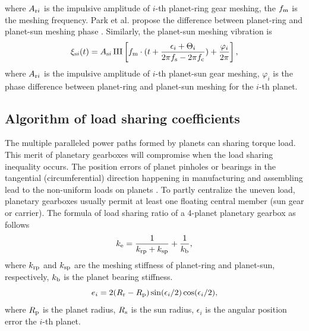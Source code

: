 \documentclass[a4paper,fleqn]{cas-sc}%
\begin{document}
where $A_{{\rm r}i}$ is the impulsive amplitude of $i$-th planet-ring gear meshing, the $f_{\rm m}$ is the meshing frequency. Park et al. propose the difference between planet-ring and planet-sun meshing phase \cite{Parker2004}. Similarly, the planet-sun meshing vibration is
\begin{equation}
    \xi_{{\rm s}i}(t)=A_{{\rm s}i} \operatorname{III}\left[f_{\rm m} \cdot (t + \frac{\epsilon_i+\Theta_i}{2 \pi f_{\rm s}- 2 \pi f_{\rm c}})+ \frac{\varphi_i}{2 \pi} \right],\label{eq:planet-sun_meshing}
\end{equation}
where $A_{{\rm r}i}$ is the impulsive amplitude of $i$-th planet-sun gear meshing, $\varphi_i$ is the phase difference between planet-ring and planet-sun meshing for the $i$-th planet.
\subsection{Algorithm of load sharing coefficients\label{sec:algorithm_load_sharing}}
\par The multiple paralleled power paths formed by planets can sharing torque load. This merit of planetary gearboxes will compromise when the load sharing inequality occurs. The position errors of planet pinholes or bearings in the tangential (circumferential) direction happening in manufacturing and assembling lead to the non-uniform loads on planets \cite{Singh2010511-530}. To partly centralize the uneven load, planetary gearboxes usually permit at least one floating central member (sun gear or carrier). The formula of load sharing ratio of a 4-planet planetary gearbox as follows \cite{Ligata2009}
\begin{equation}
    k_{\rm e}=\frac{1}{k_{\rm rp}+k_{\rm sp}}+\frac{1}{k_{\rm b}},\label{eq:stiffness}
\end{equation}
where $k_{\rm rp}$ and $k_{\rm sp}$ are the meshing stiffness of planet-ring and planet-sun, respectively, $k_{\rm b}$ is the planet bearing stiffness.
\begin{equation}
    e_{i}=2(R_{\rm r}-R_{\rm p})\sin(\epsilon_{i}/2)\cos(\epsilon_{i}/2),\label{eq:tangential_error}
\end{equation}
where $R_{\rm p}$ is the planet radius, $R_{\rm s}$ is the sun radius, $\epsilon_{i}$ is the angular position error the $i$-th planet.
\end{document}
